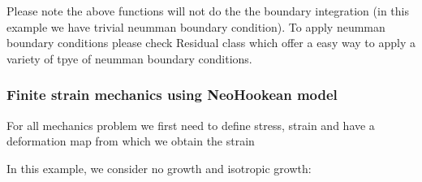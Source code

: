  Please note the above functions will not do the the boundary integration (in this example we have trivial neumman boundary condition). To apply neumman boundary conditions please check {\ttfamily Residual} class which offer a easy way to apply a variety of tpye of neumman boundary conditions. \hypertarget{brain_morph_mechanics}{}\subsubsection{Finite strain mechanics using Neo\+Hookean model}\label{brain_morph_mechanics}
For all mechanics problem we first need to define stress, strain and have a deformation map from which we obtain the strain 
\begin{DoxyCode}{0}
\end{DoxyCode}
 In this example, we consider no growth and isotropic growth\+: 
